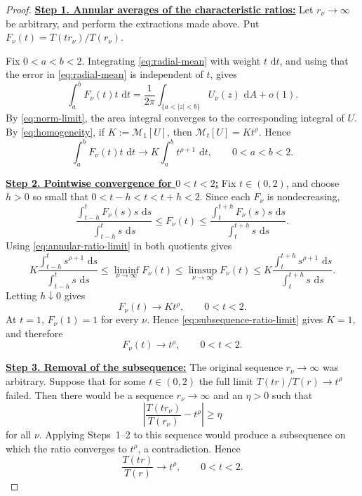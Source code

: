 \documentclass[12pt,letterpaper,reqno]{amsart}
\theoremstyle{definition}
\numberwithin{equation}{section}
\newcommand{\dd}{\,\mathrm d}
\newcommand{\dA}{\,\mathrm dA}
\newcommand{\mean}[2]{\mathcal M_{#1}\!\left[#2\right]}
\begin{document}
\begin{proof}

\medskip\noindent
\textbf{\underline{Step 1. Annular averages of the characteristic ratios:}}
Let \(r_\nu\to\infty\) be arbitrary, and perform the extractions made
above. Put
\(F_\nu(t)=T(tr_\nu)/T(r_\nu)\).

Fix \(0<a<b<2\). Integrating \eqref{eq:radial-mean} with weight
\(t\,\dd t\), and using that the error in
\eqref{eq:radial-mean} is independent of \(t\), gives
\[
\int_a^bF_\nu(t)t\,\dd t
=
\frac1{2\pi}
\int_{\{a<|z|<b\}}U_\nu(z)\,\dA
+
o(1).
\]
By \eqref{eq:norm-limit}, the area integral converges to the
corresponding integral of \(U\). By
\eqref{eq:homogeneity}, if
\(K:=\mean1U\), then \(\mean tU=Kt^\rho\). Hence
\begin{equation}\label{eq:annular-ratio-limit}
 \int_a^bF_\nu(t)t\,\dd t
 \longrightarrow
 K\int_a^bt^{\rho+1}\,\dd t,
 \qquad
 0<a<b<2.
\end{equation}


\medskip\noindent
\textbf{\underline{Step 2. Pointwise convergence for \(0<t<2\):}}
Fix \(t\in(0,2)\), and choose \(h>0\) so small that
\(0<t-h<t<t+h<2\).
Since each \(F_\nu\) is nondecreasing,
\[
\frac{\int_{t-h}^tF_\nu(s)s\,\dd s}
     {\int_{t-h}^ts\,\dd s}
\leq
F_\nu(t)
\leq
\frac{\int_t^{t+h}F_\nu(s)s\,\dd s}
     {\int_t^{t+h}s\,\dd s}.
\]
Using \eqref{eq:annular-ratio-limit} in both quotients gives
\[
K
\frac{\int_{t-h}^ts^{\rho+1}\,\dd s}
     {\int_{t-h}^ts\,\dd s}
\leq
\liminf_{\nu\to\infty}F_\nu(t)
\leq
\limsup_{\nu\to\infty}F_\nu(t)
\leq
K
\frac{\int_t^{t+h}s^{\rho+1}\,\dd s}
     {\int_t^{t+h}s\,\dd s}.
\]
Letting \(h\downarrow0\) gives
\begin{equation}\label{eq:subsequence-ratio-limit}
 F_\nu(t)\longrightarrow Kt^\rho,
 \qquad
 0<t<2.
\end{equation}
At \(t=1\), \(F_\nu(1)=1\) for every \(\nu\). Hence
\eqref{eq:subsequence-ratio-limit} gives \(K=1\), and therefore
\[
F_\nu(t)\longrightarrow t^\rho,
\qquad
0<t<2.
\]


\medskip\noindent
\textbf{\underline{Step 3. Removal of the subsequence:}}
The original sequence \(r_\nu\to\infty\) was arbitrary. Suppose that
for some \(t\in(0,2)\) the full limit
\(T(tr)/T(r)\to t^\rho\) failed. Then there would be a sequence
\(r_\nu\to\infty\) and an \(\eta>0\) such that
\[
\left|
\frac{T(tr_\nu)}{T(r_\nu)}
-
t^\rho
\right|
\geq\eta
\]
for all \(\nu\). Applying Steps~1--2 to this sequence would produce a
subsequence on which the ratio converges to \(t^\rho\), a
contradiction. Hence
\begin{equation}\label{eq:ratio-below-two}
 \frac{T(tr)}{T(r)}
 \longrightarrow t^\rho,
 \qquad
 0<t<2.
\end{equation}



\end{proof}
\end{document}
